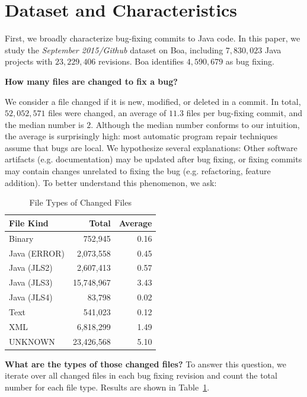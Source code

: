 \documentclass{sig-alternate-05-2015}
\begin{document}
\section{Dataset and Characteristics}

First, we broadly characterize bug-fixing commits to Java code.  In this paper,
we study the \emph{September 2015/Github} dataset on Boa, including $7,830,023$
Java projects with $23,229,406$ revisions. Boa identifies $4,590,679$ as bug
fixing.

\vspace{1ex}
\noindent\textbf{How many files are changed to fix a bug?}
%

We consider a file changed if it is new, modified, or deleted in a commit. In
total, $52,052,571$ files were changed, an average of $11.3$ files per
bug-fixing commit, and the median number is $2$.  Although the median number
conforms to our intuition, the average is surprisingly high: most automatic
program repair techniques assume that bugs are local.  We hypothesize several
explanations: Other software artifacts (e.g.  documentation) may be updated
after bug  fixing, or fixing commits may contain changes unrelated to fixing
the bug (e.g.  refactoring, feature addition).  To better understand this
phenomenon, we ask:

\begin{table}
\centering
  \begin{tabular}{ l | r  r }
  \toprule
  File Kind & Total & Average \\ 
  \midrule
  Binary & 752,945 & 0.16 \\ 
  Java (ERROR) & 2,073,558 & 0.45 \\ 
  Java (JLS2) & 2,607,413 & 0.57 \\ 
  Java (JLS3) & 15,748,967 & 3.43 \\
  Java (JLS4)  & 83,798 & 0.02 \\ 
  Text & 541,023 & 0.12 \\ 
  XML & 6,818,299 & 1.49 \\ 
  UNKNOWN & 23,426,568 & 5.10 \\ 
\bottomrule
  \end{tabular}
  \caption{File Types of Changed Files}
  \label{tbl:fileType}
\end{table}
\vspace{1ex}
\noindent\textbf{What are the types of those changed files?}
%
To answer this question, we iterate over all changed files in each bug fixing
revision and count the total number for each file type. Results are shown in
Table~\ref{tbl:fileType}.
%
\end{document}
